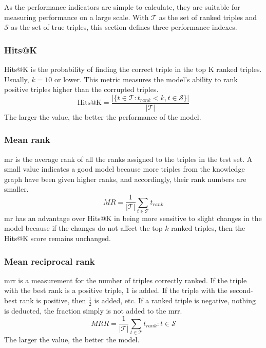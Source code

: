 
As the performance indicators are simple to calculate, they are suitable for measuring performance on a large scale. With $\mathcal{T}$ as the set of ranked triples and $\mathcal{S}$ as the set of true triples, this section defines three performance indexes.

\subsubsection{Hits@K}
\label{Hits@k}
Hits@K is the probability of finding the correct triple in the top K ranked triples. Usually, $k=10$ or lower. This metric measures the model's ability to rank positive triples higher than the corrupted triples.
\[\text{Hits@K}=\frac{|\{t\in \mathcal{T} : t_{rank}<k, t \in \mathcal{S}\}|}{|\mathcal{T}|}\]
The larger the value, the better the performance of the model.

\subsubsection{Mean rank}
\Gls{mr} is the average rank of all the ranks assigned to the triples in the test set. A small value indicates a good model because more triples from the knowledge graph have been given higher ranks, and accordingly, their rank numbers are smaller.
\[MR=\frac{1}{|\mathcal{T}|}\sum_{t\in\mathcal{T}}t_{rank}\]
\gls{mr}  has an advantage over Hits@K in being more sensitive to slight changes in the  model because if the changes do not affect the top $k$ ranked triples, then the Hits@K score remains unchanged.

\subsubsection{Mean reciprocal rank}
\Gls{mrr} is a measurement for the number of triples correctly ranked. If the triple with the best rank is a positive triple, 1 is added. If the triple with the second-best rank is positive, then $\frac{1}{2}$ is added, etc. If a ranked triple is negative, nothing is deducted, the fraction simply is not added to the \gls{mrr}.
\[MRR=\frac{1}{|\mathcal{T}|}\sum_{t\in\mathcal{T}}t_{rank} : t\in \mathcal{S}\]
The larger the value, the better the model.
    
